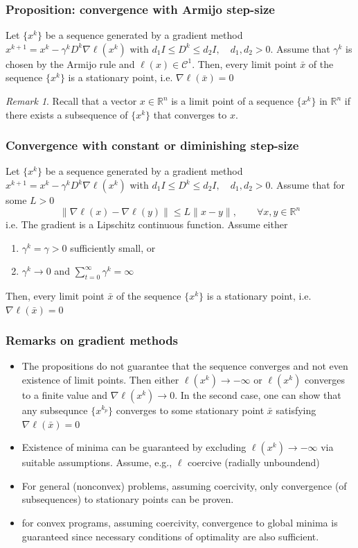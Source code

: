 \documentclass[openany]{book}
\newcommand{\R}{\mathbb{R}} %
\theoremstyle{definition}
\theoremstyle{remark}
\newtheorem*{remark}{Remark} %
\begin{document}
\subsubsection{Proposition: convergence with Armijo step-size}
Let $\{x^k\}$ be a sequence generated by a gradient method $x^{k+1}=x^k-\gamma^kD^k\nabla\ell(x^k)$ with $d_1I\leq D^k \leq d_2I, \quad d_1,d_2>0$. Assume that $\gamma^k$ is chosen by the Armijo rule and $\ell(x)\in \mathcal{C}^1$. Then, every limit point $\bar{x}$ of the sequence $\{x^k\}$ is a stationary point, i.e. $\nabla\ell(\bar{x})=0$
\begin{remark}
Recall that a vector $x\in\R^n$ is a limit point of a sequence $\{x^k\}$ in $\R^n$ if there exists a subsequence of $\{x^k\}$ that converges to $x$.
\end{remark}
\subsubsection{Convergence with constant or diminishing step-size}
Let $\{x^k\}$ be a sequence generated by a gradient method $x^{k+1}=x^k-\gamma^kD^k\nabla\ell(x^k)$ with $d_1I\leq D^k \leq d_2I, \quad d_1,d_2>0$. Assume that for some $L>0$ 
\[
    \|\nabla\ell(x)-\nabla\ell(y)\|\leq L\|x-y\|, \qquad \forall x,y\in\R^n
\]
i.e. The gradient is a Lipschitz continuous function.
Assume either
\begin{enumerate}
    \item $\gamma^k=\gamma>0$ sufficiently small, or 
    \item $\gamma^k\to 0$ and $\displaystyle\sum_{t=0}^{\infty}\gamma^k=\infty$
\end{enumerate}
Then, every limit point $\bar{x}$ of the sequence $\{x^k\}$ is a stationary point, i.e. $\nabla\ell(\bar{x})=0$

\subsubsection{Remarks on gradient methods}
\begin{itemize}
    \item The propositions do not guarantee that the sequence converges and not even existence of limit points. Then either $\ell(x^k)\to-\infty$ or $\ell(x^k)$ converges to a finite value and $\nabla\ell(x^k)\to 0$. In the second case, one can show that any subsequnce $\{x^{k_p}\}$ converges to some stationary point $\bar{x}$ satisfying $\nabla\ell(\bar{x})=0$
    \item Existence of minima can be guaranteed by excluding $\ell(x^k)\to-\infty$ via suitable assumptions. Assume, e.g., $\ell$ coercive (radially unboundend)
    \item For general (nonconvex) problems, assuming coercivity, only convergence (of subsequences) to stationary points can be proven.
    \item for convex programs, assuming coercivity, convergence to global minima is guaranteed since necessary conditions of optimality are also sufficient.
\end{itemize}
\end{document}

